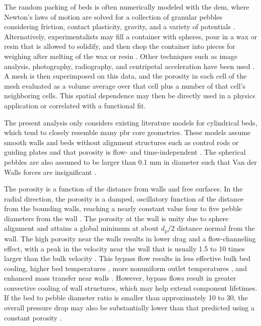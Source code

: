 The random packing of beds is often numerically modeled with the \gls{dem}, where Newton's laws of motion are solved for a collection of granular pebbles considering friction, contact plasticity, gravity, and a variety of potentials \cite{duToit2008,auwerda2013,rycroft,abdalla,suikkanen,y_li,auwerda_2011,zhang2016}. Alternatively, experimentalists may fill a container with spheres, pour in a wax or resin that is allowed to solidify, and then chop the container into pieces for weighing after melting of the wax or resin \cite{goodling,benenati,roblee}. Other techniques such as image analysis, photography, radiography, and centripetal acceleration have been used \cite{goodling1985,mueller,giese}. A mesh is then superimposed on this data, and the porosity in each cell of the mesh evaluated as a volume average over that cell plus a number of that cell's neighboring cells. This spatial dependence may then be directly used in a physics application or correlated with a functional fit. 

The present analysis only considers existing literature models for cylindrical beds, which tend to closely resemble many \gls{pbr} core geometries. These models assume smooth walls and beds without alignment structures such as control rods or guiding plates \cite{bai,rycroft} and that porosity is flow- and time-independent \cite{y_li,li}. The spherical pebbles are also assumed to be larger than 0.1 \si{\milli\meter} in diameter such that Van der Walls forces are insignificant \cite{yang2000}.

The porosity is a function of the distance from walls and free surfaces. In the radial direction, the porosity is a damped, oscillatory function of the distance from the bounding walls, reaching a nearly constant value four to five pebble diameters from the wall \cite{auwerda2013,benenati,cohen,klerk,duToit2008,giese,goodling,roblee,mueller}. The porosity at the wall is unity due to sphere alignment and attains a global minimum at about \(d_p/2\) distance normal from the wall. The high porosity near the walls results in lower drag and a flow-channeling effect, with a peak in the velocity near the wall that is usually 1.5 to 10 times larger than the bulk velocity \cite{vortmeyer,amiri,y_li,amini,martin,lerou,white,cohen,giese,zhang2016}. This bypass flow results in less effective bulk bed cooling, higher bed temperatures \cite{auwerda_2011,becker}, more nonuniform outlet temperatures \cite{zhao}, and enhanced mass transfer near walls \cite{zhang2016}. However, bypass flows result in greater convective cooling of wall structures, which may help extend component lifetimes. If the bed to pebble diameter ratio is smaller than approximately 10 to 30, the overall pressure drop may also be substantially lower than that predicted using a constant porosity \cite{auwerda_2011,cohen}.

